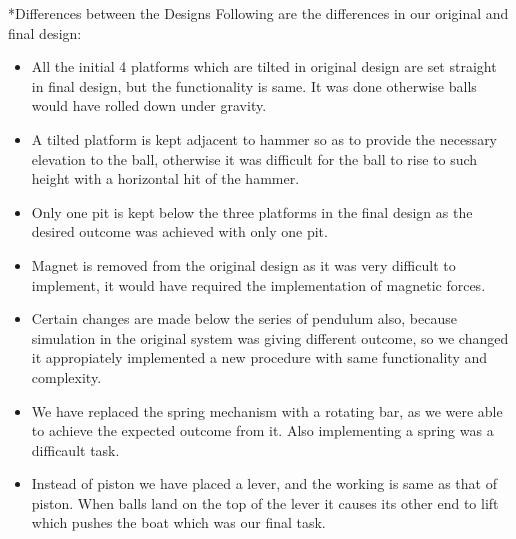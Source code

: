 \documentclass[11pt]{article}
\begin{document}
\begin{subsection}*{Differences between the Designs}
Following are the differences in our original and final design: 
\begin{itemize}
\item All the initial 4 platforms which are tilted in original design are set straight in final design, but the functionality is same. It was done otherwise balls would have rolled down under gravity.
\item A tilted platform is kept adjacent to hammer so as to provide the necessary elevation to the ball, otherwise it was difficult for the ball to rise to such height with a horizontal hit of the hammer. 
\item Only one pit is kept below the three platforms in the final design as the desired outcome was achieved with only one pit. 
\item Magnet is removed from the original design as it was very difficult to implement, it would have required the implementation of magnetic forces.
\item Certain changes are made below the series of pendulum also, because simulation in the original system was giving different outcome, so we changed it appropiately implemented a new procedure with same functionality and complexity.
\item We have replaced the spring mechanism with a rotating bar, as we were able to achieve the expected outcome from it. Also implementing a spring was a difficault task.
\item Instead of piston we have placed a lever, and the working is same as that of piston. When balls land on the top of the lever it causes its other end to lift which pushes the boat which was our final task.
\end {itemize}
\end{subsection}
\end{document}
